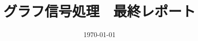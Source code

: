 \documentclass[dvipdfmx]{jsarticle}
\begin{document}
\title{グラフ信号処理　最終レポート}
\date{\today}
\author{}
\maketitle

\newpage

\newpage





\end{document}
